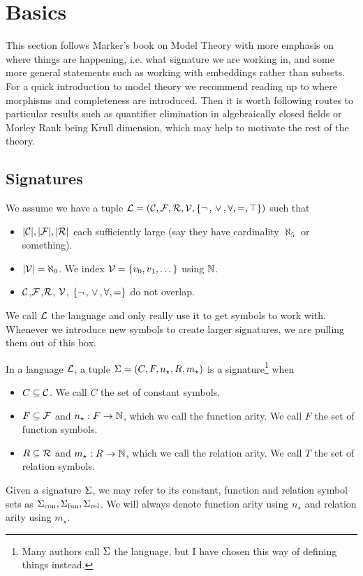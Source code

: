 \section{Basics}
This section follows Marker's book on Model Theory 
\cite{marker} with more 
emphasis on where things are happening, i.e. what signature we are working in,
and some more general statements such as working with embeddings rather than 
subsets.
For a quick introduction to model theory we recommend reading up to where 
morphisms and completeness are introduced.
Then it is worth following routes to particular results such as quantifier
elimination in algebraically closed fields or Morley Rank being Krull dimension,
which may help to motivate the rest of the theory.

\subsection{Signatures}
\begin{dfn}
    We assume we have a tuple
    $\mathcal{L} = (\mathcal{C},\mathcal{F},\mathcal{R},\mathcal{V},\left\{\neg\,,\, \lor \,,\forall,=,\top\right\})$ such that 
    \begin{itemize}
        \item $|\mathcal{C}|,|\mathcal{F}|,|\mathcal{R}|$ each sufficiently large 
            (say they have cardinality $\aleph_5$ or something).
        \item $|\mathcal{V}| = \aleph_0$. 
            We index $\mathcal{V} = \left\{v_0, v_1, \dots \right\}$ using $\mathbb{N}$.
        \item $\mathcal{C}$,$\mathcal{F}$,$\mathcal{R}$, $\mathcal{V}$, $\left\{\neg\,,\, \lor \,,\forall,=\right\}$ 
            do not overlap.
    \end{itemize}
    We call $\mathcal{L}$ the language and only really 
    use it to get symbols to work with.
    Whenever we introduce new symbols to create larger signatures, 
    we are pulling them out of this box.
\end{dfn}

\begin{dfn}[Signature]
    In a language $\mathcal{L}$, 
    a tuple $\Sigma = (C,F,n_\star ,R, m_\star)$ is a signature\footnote{
        Many authors call $\Sigma$ the language, 
        but I have chosen this way of defining things instead.
    } when 
    \begin{itemize}
        \item $C \subseteq \mathcal{C}$. 
            We call $C$ the set of constant symbols.
        \item $F \subseteq \mathcal{F}$ and 
            $n_{\star} : F \to \mathbb{N}$, 
            which we call the function arity. 
            We call $F$ the set of function symbols.
        \item $R \subseteq \mathcal{R}$
            and $m_{\star} : R \to \mathbb{N}$,
            which we call the relation arity.
            We call $T$ the set of relation symbols.
    \end{itemize}
    Given a signature $\Sigma$, we may refer to its constant, 
    function and relation symbol sets as ${\Sigma}_\mathrm{con},{\Sigma}_\mathrm{fun},{\Sigma}_\mathrm{rel}$.
    We will always denote function arity using $n_\star$ 
    and relation arity using $m_\star$.
\end{dfn}

